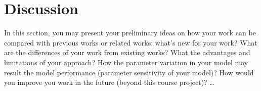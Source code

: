\chapter{Discussion}
In this section, you may present your preliminary ideas on how your work can be
compared with previous works or related works: what's new for your work? What are
the differences of your work from existing works? What the advantages and
limitations of your approach? How the parameter variation in your model may result
the model performance (parameter sensitivity of your model)? How would you
improve you work in the future (beyond this course project)? …